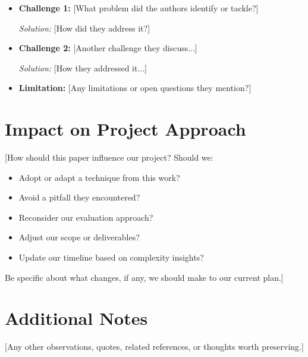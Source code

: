 \documentclass[12pt]{article}
\begin{document}
\begin{itemize}[leftmargin=1.5em, itemsep=4pt]
  \item \textbf{Challenge 1:} [What problem did the authors identify or tackle?]

    \textit{Solution:} [How did they address it?]

  \item \textbf{Challenge 2:} [Another challenge they discuss...]

    \textit{Solution:} [How they addressed it...]

  \item \textbf{Limitation:} [Any limitations or open questions they mention?]
\end{itemize}

\section{Impact on Project Approach}

[How should this paper influence our project? Should we:
\begin{itemize}[leftmargin=1.5em, itemsep=2pt]
  \item Adopt or adapt a technique from this work?
  \item Avoid a pitfall they encountered?
  \item Reconsider our evaluation approach?
  \item Adjust our scope or deliverables?
  \item Update our timeline based on complexity insights?
\end{itemize}
Be specific about what changes, if any, we should make to our current plan.]

\section{Additional Notes}

[Any other observations, quotes, related references, or thoughts worth preserving.]
\end{document}
